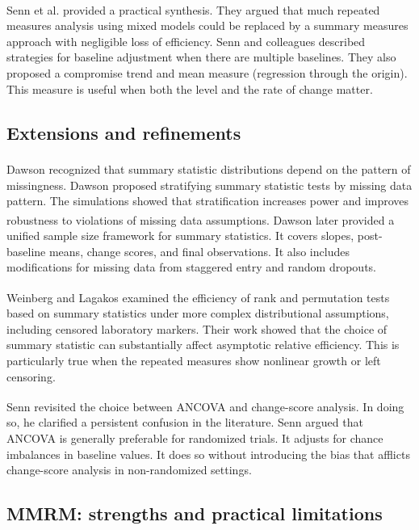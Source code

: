 \documentclass[
  11pt,
]{article}
\begin{document}
Senn et al.\textsuperscript{} provided a practical
synthesis. They argued that much repeated measures analysis
using mixed models could be replaced by a summary measures
approach with negligible loss of efficiency. Senn and
colleagues described strategies for baseline adjustment when
there are multiple baselines. They also proposed a compromise
trend and mean measure (regression through the origin). This
measure is useful when both the level and the rate of change
matter.

\subsection{Extensions and refinements}\label{extensions-and-refinements}

Dawson\textsuperscript{} recognized that
summary statistic distributions depend on the pattern of
missingness. Dawson proposed stratifying summary statistic tests
by missing data pattern. The simulations showed that
stratification increases power and improves robustness to
violations of missing data assumptions.
Dawson\textsuperscript{} later provided a unified
sample size framework for summary statistics. It covers
slopes, post-baseline means, change scores, and final
observations. It also includes modifications for missing data
from staggered entry and random dropouts.

Weinberg and Lagakos\textsuperscript{} examined
the efficiency of rank and permutation tests based on summary statistics
under more complex distributional assumptions, including censored
laboratory markers. Their work showed that the choice of summary
statistic can substantially affect asymptotic relative efficiency. This
is particularly true when the repeated measures show nonlinear growth or
left censoring.

Senn\textsuperscript{} revisited the choice between
ANCOVA and change-score analysis. In doing so, he clarified a
persistent confusion in the literature. Senn argued that
ANCOVA is generally preferable for randomized trials. It
adjusts for chance imbalances in baseline values. It does so
without introducing the bias that afflicts change-score
analysis in non-randomized settings.

\subsection{MMRM: strengths and practical limitations}\label{mmrm-strengths-and-practical-limitations}
\end{document}
